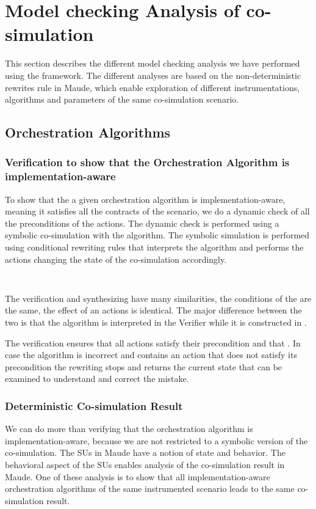 \section{Model checking Analysis of co-simulation}
This section describes the different model checking analysis we have performed using the framework.
The different analyses are based on the non-deterministic rewrites rule in Maude, which enable exploration of different instrumentations, algorithms and parameters of the same co-simulation scenario.

\subsection{Orchestration Algorithms}

\subsubsection{Verification to show that the Orchestration Algorithm is implementation-aware}
To show that the a given orchestration algorithm is implementation-aware, meaning it satisfies all the contracts of the scenario, we do a dynamic check of all the preconditions of the actions.
The dynamic check is performed using a symbolic co-simulation with the algorithm. 
The symbolic simulation is performed using conditional rewriting rules that interprets the algorithm and performs the actions changing the state of the co-simulation accordingly. 

\begin{lstlisting}
    
\end{lstlisting}

The verification and synthesizing have many similarities, the conditions of the are the same, the effect of an actions is identical.
The major difference between the two is that the algorithm is interpreted in the Verifier while it is constructed in .

The verification ensures that all actions satisfy their precondition and that .
In case the algorithm is incorrect and contains an action that does not satisfy its precondition the rewriting stops and returns the current state that can be examined to understand and correct the mistake.

\subsubsection{Deterministic Co-simulation Result}
We can do more than verifying that the orchestration algorithm is implementation-aware, because we are not restricted to a symbolic version of the co-simulation.
The SUs in Maude have a notion of state and behavior. 
The behavioral aspect of the SUs enables analysis of the co-simulation result in Maude.
One of these analysis is to show that all implementation-aware orchestration algorithms of the same instrumented scenario leads to the same co-simulation result. 


